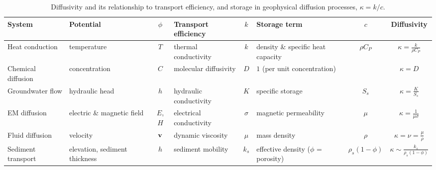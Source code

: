 \begin{table}[htp]
    \centering
    \caption{Diffusivity and its relationship to transport efficiency, and storage in geophysical diffusion processes, $\kappa = k/c$.}
    \label{tab:diffusivity}
    \small
    \begin{tabularx}{\textwidth}{lYcYcYcc}
        \toprule
        \textbf{System} 
        & \textbf{Potential} 
        & $\phi$
        & \textbf{Transport efficiency} 
        & $k$
        & \textbf{Storage term} 
        & $c$
        & \textbf{Diffusivity} \\
        \midrule
        Heat conduction 
        & temperature & $T$ 
        & thermal conductivity & $k$ 
        & density \& specific heat capacity & $\rho C_P$ 
        & $\displaystyle \kappa = \frac{k}{\rho C_P}$ \\

        Chemical diffusion 
        & concentration & $C$ 
        & molecular diffusivity & $D$ 
        & $1$ (per unit concentration) &
        & $\displaystyle \kappa = D$ \\

        Groundwater flow 
        & hydraulic head & $h$ 
        & hydraulic conductivity & $K$ 
        & specific storage & $S_s$ 
        & $\displaystyle \kappa = \frac{K}{S_s}$ \\

        EM diffusion 
        & electric \& magnetic field & $E$, $H$
        & electrical conductivity & $\sigma$ 
        & magnetic permeability & $\mu$ 
        & $\displaystyle \kappa = \frac{1}{\mu\sigma}$ \\

        Fluid diffusion
        & velocity & $\vb{v}$ 
        & dynamic viscosity & $\mu$ 
        & mass density & $\rho$ 
        & $\displaystyle \kappa = \nu = \frac{\mu}{\rho}$ \\

        Sediment transport
        & elevation, sediment thickness & $h$
        & sediment mobility & $k_s$ 
        & effective density ($\phi$ = porosity) & $\rho_s(1 - \phi)$
        & $\displaystyle \kappa \sim \frac{k_s}{\rho_s(1 - \phi)}$ \\
        \bottomrule
    \end{tabularx}
\end{table}